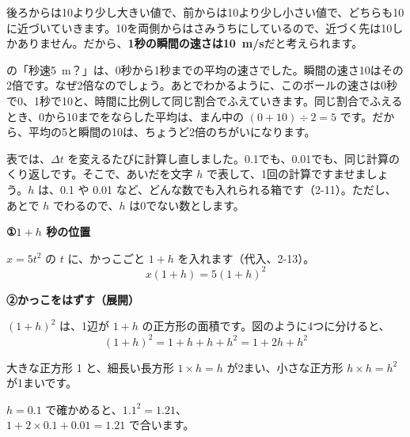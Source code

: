 後ろからは10より少し大きい値で、前からは10より少し小さい値で、どちらも10に近づいていきます。10を両側からはさみうちにしているので、近づく先は10しかありません。だから、\textbf{1秒の瞬間の速さは\qty{10}{m/s}}だと考えられます。

\bkhatenaref の「秒速\qty{5}{m}？」は、0秒から1秒までの平均の速さでした。瞬間の速さ10はその2倍です。なぜ2倍なのでしょう。あとでわかるように、このボールの速さは0秒で0、1秒で10と、時間に比例して同じ割合でふえていきます。同じ割合でふえるとき、0から10までをならした平均は、まん中の $(0+10)\div2=5$ です。だから、平均の5と瞬間の10は、ちょうど2倍のちがいになります。


\leavevmode\label{bk:5-2:h}表では、$\Delta t$ を変えるたびに計算し直しました。0.1でも、0.01でも、同じ計算のくり返しです。そこで、あいだを文字 $h$ で表して、1回の計算ですませましょう。$h$ は、0.1 や 0.01 など、どんな数でも入れられる箱です（2-11）。ただし、あとで $h$ でわるので、$h$ は0でない数とします。

\noindent\textbf{①\enspace $1+h$ 秒の位置}\par
$x=5t^2$ の $t$ に、かっこごと $1+h$ を入れます（代入、2-13）。
\[ x(1+h)=5(1+h)^2 \]

\noindent\textbf{②\enspace かっこをはずす（展開）}\par
$(1+h)^2$ は、1辺が $1+h$ の正方形の面積です。図のように4つに分けると、
\[ (1+h)^2=1+h+h+h^2=1+2h+h^2 \]

\noindent\begin{minipage}[c]{0.52\linewidth}
\end{minipage}\hfill
\begin{minipage}[c]{0.45\linewidth}\raggedright
大きな正方形 1 と、細長い長方形 $1\times h=h$ が2まい、小さな正方形 $h\times h=h^2$ が1まいです。

$h=0.1$ で確かめると、$1.1^2=1.21$、\\$1+2\times0.1+0.01=1.21$ で合います。
\end{minipage}

